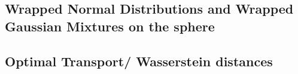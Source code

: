 \documentclass[]{article}
\begin{document}
%
%
%
%
%
%
%

\subsection{Wrapped Normal Distributions and Wrapped Gaussian Mixtures on the sphere}

\subsection{Optimal Transport/ Wasserstein distances}
\end{document}
